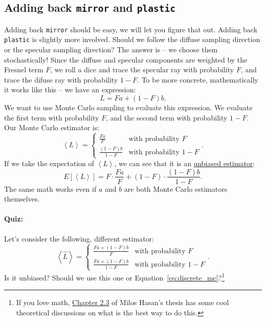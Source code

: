 \subsection{Adding back \protect\lstinline!mirror! and \protect\lstinline!plastic!}
Adding back \lstinline{mirror} should be easy, we will let you figure that out. Adding back \lstinline{plastic} is slightly more involved. Should we follow the diffuse sampling direction or the specular sampling direction? The answer is -- we choose them stochastically! Since the diffuse and specular components are weighted by the Fresnel term $F$, we roll a dice and trace the specular ray with probability $F$, and trace the difuse ray with probability $1-F$. To be more concrete, mathematically it works like this -- we have an expression:
\begin{equation}
L = F a + (1 - F) b.
\end{equation}
We want to use Monte Carlo sampling to evaluate this expression. We evaluate the first term with probability $F$, and the second term with probability $1-F$. Our Monte Carlo estimator is:
\begin{equation}
\left<L\right> = \begin{cases}
\frac{F a}{F} & \text{with probability } F \\
\frac{\left(1 - F\right) b}{1 - F} & \text{with probability } 1 - F
\end{cases}.
\label{eq:discrete_mc}
\end{equation}
If we take the expectation of $\left<L\right>$, we can see that it is an \href{https://en.wikipedia.org/wiki/Bias_of_an_estimator}{unbiased estimator}:
\begin{equation}
E\left[\left<L\right>\right] = F \cdot \frac{F a}{F} + (1 - F) \cdot \frac{(1 - F) b}{1 - F}.
\end{equation}
The same math works even if $a$ and $b$ are both Monte Carlo estimators themselves.

\paragraph{Quiz:} Let's consider the following, different estimator:
\begin{equation}
\left<\hat{L}\right> = \begin{cases}
\frac{F a + (1 - F)b}{F} & \text{with probability } F \\
\frac{F a + (1 - F)b}{1 - F} & \text{with probability } 1 - F
\end{cases}.
\end{equation}
Is it unbiased? Should we use this one or Equation~\eqref{eq:discrete_mc}?\footnote{If you love math, \href{https://ecommons.cornell.edu/handle/1813/13985}{Chapter 2.3} of Milos Hasan's thesis has some cool theoretical discussions on what is the best way to do this.}

